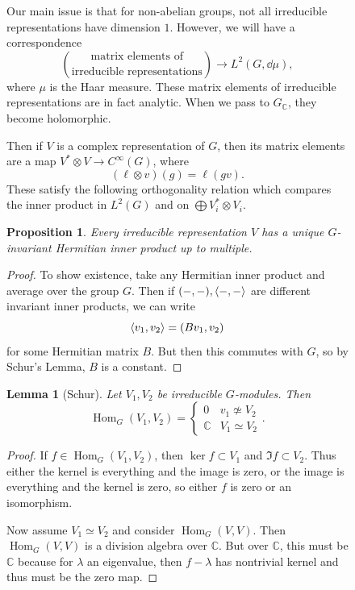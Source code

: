 \documentclass[leqno, openany]{memoir}
\newtheorem{prop}[thm]{Proposition}
\newtheorem{lem}[thm]{Lemma}
\theoremstyle{definition}
\theoremstyle{remark}
\theoremstyle{plain}
\theoremstyle{definition}
\theoremstyle{remark}
\newcommand{\C}{\mathbb{C}}
\DeclareMathOperator{\Hom}{Hom}
\begin{document}
\begin{figure}[H]
Our main issue is that for non-abelian groups, not all irreducible
representations have dimension $1$. However, we will have a correspondence \[
\binom{\text{matrix elements of}}{\text{irreducible representations}}
\longrightarrow L^2(G, \dd{\mu}), \] where $\mu$ is the Haar measure. These
matrix elements of irreducible representations are in fact analytic. When we
pass to $G_{\C}$, they become holomorphic.

Then if $V$ is a complex representation of $G$, then its matrix elements are a
map $V^* \otimes V \to C^{\infty}(G)$, where \[ ( \ell \otimes v )(g) =
\ell(gv). \] These satisfy the following orthogonality relation which compares
the inner product in $L^2(G)$ and on $\bigoplus V_i^* \otimes V_i$. 

\begin{prop} Every irreducible representation $V$ has a unique $G$-invariant
Hermitian inner product up to multiple.  \end{prop}

\begin{proof} To show existence, take any Hermitian inner product and average
    over the group $G$. Then if $(-,-), \ev{-,-}$ are different invariant inner
    products, we can write \[ \ev{v_1, v_2} = (Bv_1, v_2) \] for some Hermitian
    matrix $B$. But then this commutes with $G$, so by Schur's Lemma, $B$ is a
    constant.  \end{proof}

\begin{lem}[Schur] Let $V_1, V_2$ be irreducible $G$-modules. Then \[
    \Hom_G(V_1, V_2) = \begin{cases} 0 & v_1 \not\simeq V_2 \\ \C & V_1 \simeq
    V_2 \end{cases}. \] \end{lem}

\begin{proof} If $f \in \Hom_G(V_1, V_2)$, then $\ker f \subset V_1$ and $\Im f
    \subset V_2$. Thus either the kernel is everything and the image is zero,
    or the image is everything and the kernel is zero, so either $f$ is zero or
    an isomorphism.

    Now assume $V_1 \simeq V_2$ and consider $\Hom_G(V,V)$. Then $\Hom_G(V,V)$
is a division algebra over $\C$. But over $\C$, this must be $\C$ because for
$\lambda$ an eigenvalue, then $f-\lambda$ has nontrivial kernel and thus must
be the zero map.  \end{proof}


\end{figure}
\end{document}
